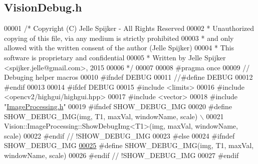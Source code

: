 \hypertarget{_vision_debug_8h_source}{}\subsection{Vision\+Debug.\+h}
\label{_vision_debug_8h_source}

\begin{DoxyCode}
00001 \textcolor{comment}{/* Copyright (C) Jelle Spijker - All Rights Reserved}
00002 \textcolor{comment}{ * Unauthorized copying of this file, via any medium is strictly prohibited}
00003 \textcolor{comment}{ * and only allowed with the written consent of the author (Jelle Spijker)}
00004 \textcolor{comment}{ * This software is proprietary and confidential}
00005 \textcolor{comment}{ * Written by Jelle Spijker <spijker.jelle@gmail.com>, 2015}
00006 \textcolor{comment}{ */}
00007 
00008 \textcolor{preprocessor}{#pragma once}
00009 \textcolor{comment}{// Debuging helper macros}
00010 \textcolor{preprocessor}{#ifndef DEBUG}
00011 \textcolor{comment}{//#define DEBUG}
00012 \textcolor{preprocessor}{#endif}
00013 
00014 \textcolor{preprocessor}{#ifdef DEBUG}
00015 \textcolor{preprocessor}{#include <limits>}
00016 \textcolor{preprocessor}{#include <opencv2/highgui/highgui.hpp>}
00017 \textcolor{preprocessor}{#include <vector>}
00018 \textcolor{preprocessor}{#include "\hyperlink{_image_processing_8h}{ImageProcessing.h}"}
00019 \textcolor{preprocessor}{#ifndef SHOW\_DEBUG\_IMG}
00020 \textcolor{preprocessor}{#define SHOW\_DEBUG\_IMG(img, T1, maxVal, windowName, scale)                     \(\backslash\)}
00021 \textcolor{preprocessor}{  Vision::ImageProcessing::ShowDebugImg<T1>(img, maxVal, windowName, scale)}
00022 \textcolor{preprocessor}{#endif // !SHOW\_DEBUG\_IMG}
00023 \textcolor{preprocessor}{#else}
00024 \textcolor{preprocessor}{#ifndef SHOW\_DEBUG\_IMG}
\hypertarget{_vision_debug_8h_source_l00025}{}\hyperlink{_vision_debug_8h_aae864fa4f990213a4184a209ff236202}{00025} \textcolor{preprocessor}{#define SHOW\_DEBUG\_IMG(img, T1, maxVal, windowName, scale)}
00026 \textcolor{preprocessor}{#endif // !SHOW\_DEBUG\_IMG}
00027 \textcolor{preprocessor}{#endif}
\end{DoxyCode}
